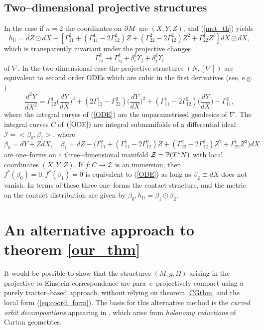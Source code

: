 \subsection{Two--dimensional projective structures}
In the case if $n=2$ the coordinates on $\partial M$ are $(X, Y, Z)$,  and (\ref{met_th}) yields
\[
h_{ \mathbb{H} }=dZ\odot dX-[\Gamma_{11}^2+(\Gamma_{11}^1-2\Gamma_{12}^2)Z+(\Gamma_{22}^2-2\Gamma_{12}^2)Z^2+
\Gamma_{22}^1Z^3]dX\odot dX,
\]
which is transparently invariant under the projective changes 
\[
\Gamma_{ij}^k\longrightarrow \Gamma_{ij}^k+\delta^k_i\Upsilon_j+\delta^k_j\Upsilon_i
\]
of $\nabla$.
In the  two-dimensional case the 
projective
structures $(N, [\nabla])$ are equivalent to second order ODEs which are cubic in
the first derivatives (see, e.g. \cite{BDE})
\begin{equation}
\label{ODE}
\frac{d^2 Y}{d X^2}=\Gamma^1_{22}\Big(\frac{d Y}{d X}\Big)^3
+(2\Gamma^1_{12}-\Gamma^2_{22})\Big(\frac{d Y}{d X}\Big)^2
+(\Gamma^1_{11}-2\Gamma^2_{12})\Big(\frac{d Y}{d X}\Big)-
\Gamma^2_{11},
\end{equation}
where the integral curves of (\ref{ODE}) are the unparametrised geodesics of $\nabla$. 
The integral curves $C$ of $(\ref{ODE})$ are integral submanifolds
of a  differential
ideal ${\mathcal I}=<\beta_0, \beta_1>$, where
\[
\beta_0=dY+ZdX, \quad \beta_1=dZ-\Big(\Gamma_{11}^2+(\Gamma_{11}^1-2\Gamma_{12}^2)Z+(\Gamma_{22}^2-2\Gamma_{12}^1)Z^2+
\Gamma_{22}^1Z^3\Big)dX
\]
are one--forms on a three--dimensional manifold $\mathcal{Z}=\mathbb{P}(T^*N)$ with local coordinates $(X, Y, Z)$. If $f:C\rightarrow \mathcal{Z}$ is an immersion, then $f^*(\beta_0)=0, f^*(\beta_1)=0$ is equivalent
to (\ref{ODE}) as long as $\beta_2\equiv dX$ does not vanish. In terms of these three one--forms
the contact structure, and the metric on the contact distribution are given by
$
\beta_0,  h_{ \mathbb{H} }=\beta_1\odot\beta_2.
$

\section{An alternative approach to theorem \ref{our_thm}}


It would be possible to show that the structures $(M,g,\Omega)$ arising in the projective to Einstein correspondence are para--$c$--projectively compact using a purely tractor--based approach, without relying on theorem \ref{CGthm} and the local form (\ref{eq:coord_form}). The basis for this alternative method is the \textit{curved orbit decompositions} appearing in \cite{CGH-duke}, which arise from \textit{holonomy reductions} of Cartan geometries.

